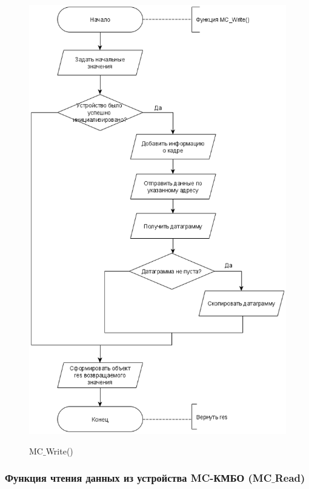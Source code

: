 	\begin{figure}[ph!]
		\centering
		\begin{center}
			{\includegraphics[scale=0.5]{schemes/mc_write.png}}
			\caption{MC$\_$Write()}
			\label{fig12:image}
		\end{center}
	\end{figure}

	\newpage
	\subsubsection{Функция чтения данных из устройства MC-КМБО (MC$\_$Read)}
	
